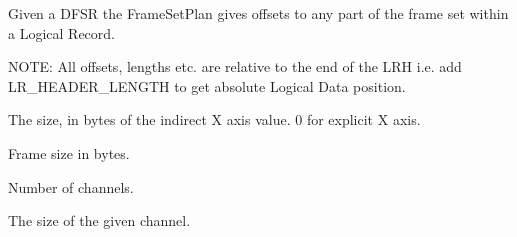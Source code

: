 \documentclass[letterpaper,10pt,english]{sphinxmanual}
\begin{document}
\begin{fulllineitems}
\label{\detokenize{ref/LIS/core/Type01Plan:TotalDepth.LIS.core.Type01Plan.FrameSetPlan}}
Given a DFSR the FrameSetPlan gives offsets to any part of the frame set
within a Logical Record.

NOTE: All offsets, lengths etc. are relative to the end of the LRH
i.e. add LR\_HEADER\_LENGTH to get absolute Logical Data position.

\begin{fulllineitems}
\label{\detokenize{ref/LIS/core/Type01Plan:TotalDepth.LIS.core.Type01Plan.FrameSetPlan.indirectSize}}
The size, in bytes of the indirect X axis value. 0 for explicit X axis.

\end{fulllineitems}


\begin{fulllineitems}
\label{\detokenize{ref/LIS/core/Type01Plan:TotalDepth.LIS.core.Type01Plan.FrameSetPlan.frameSize}}
Frame size in bytes.

\end{fulllineitems}


\begin{fulllineitems}
\label{\detokenize{ref/LIS/core/Type01Plan:TotalDepth.LIS.core.Type01Plan.FrameSetPlan.numChannels}}
Number of channels.

\end{fulllineitems}


\begin{fulllineitems}
\label{\detokenize{ref/LIS/core/Type01Plan:TotalDepth.LIS.core.Type01Plan.FrameSetPlan.channelSize}}
The size of the given channel.

\end{fulllineitems}


\end{fulllineitems}
\end{document}
